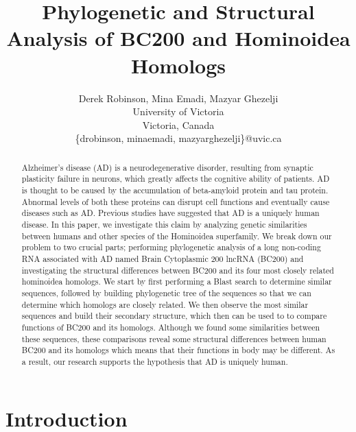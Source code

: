 \documentclass[conference, 11pt]{IEEEtran}
\begin{document}


\title{Phylogenetic and Structural Analysis of BC200 and Hominoidea Homologs}

\author{Derek Robinson, Mina Emadi, Mazyar Ghezelji\\
University of Victoria\\
Victoria, Canada \\
\{drobinson, minaemadi, mazyarghezelji\}@uvic.ca}

\maketitle

\begin{abstract}
Alzheimer’s disease (AD) is a neurodegenerative disorder, resulting from synaptic plasticity failure in neurons, which greatly affects the cognitive ability of patients. 
AD is thought to be caused by the accumulation of beta-amyloid protein and tau protein. Abnormal levels of both these proteins can disrupt cell functions and eventually cause diseases such as AD. 
Previous studies have suggested that AD is a uniquely human disease. 
In this paper, we investigate this claim by analyzing genetic similarities between humans and other species of the Hominoidea superfamily.
We break down our problem to two crucial parts; performing phylogenetic analysis of a long non-coding RNA associated with AD named Brain Cytoplasmic 200 lncRNA (BC200) and investigating the structural differences between BC200 and its four most closely related hominoidea homologs. 
We start by first performing a Blast search to determine similar sequences, followed by building phylogenetic tree of the sequences so that we can determine which homologs are closely related.
We then observe the most similar sequences and build their secondary structure, which then can be used to to compare functions of BC200 and its homologs.
Although we found some similarities between these sequences, these comparisons reveal some structural differences between human BC200 and its homologs which means that their functions in body may be different.
As a result, our research supports the hypothesis that AD is uniquely human.

\end{abstract}

\section{Introduction}\label{sec:intro}
\end{document}
